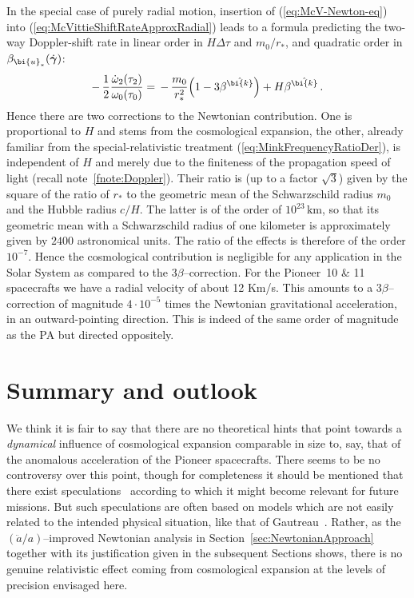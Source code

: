\documentclass
[rmp,aps,twocolumn,showpacs,preprintnumbers,amsmath,amssymb]{revtex4}
\theoremstyle{plain}
\theoremstyle{definition}
\theoremstyle{remark}
\newcommand{\bk}{\bi{k}}
\newcommand{\bu}{\bi{u}}
\newcommand{\bgamma}{\boldsymbol{\gamma}}
\begin{document}
In the special case of purely radial motion, insertion of 
(\ref{eq:McV-Newton-eq}) into (\ref{eq:McVittieShiftRateApproxRadial})
leads to a formula predicting the two-way Doppler-shift rate in 
linear order in $H\Delta\tau$ and $m_0/r_*$, and quadratic order 
in $\beta_{\bu_*}(\dot{\bgamma})$:
%
\begin{equation}\label{eq:McVittie-Doppler-tracking-geodesic}
-\,\frac{1}{2}\frac{\dot\omega_2(\tau_2)}{\omega_0(\tau_0)}
=\,-\,\frac{m_0}{r_*^2} \Big( 1 - 3\beta^{\hat{\bk}} \Big)
          +H\beta^{\hat{\bk}}\,.
\end{equation}
%
Hence there are two corrections to the Newtonian contribution.
One is proportional to $H$ and stems from the cosmological 
expansion, the other, already familiar from the special-relativistic
treatment (\ref{eq:MinkFrequencyRatioDer}), is independent 
of $H$ and merely due to the finiteness of the propagation 
speed of light (recall note~\ref{fnote:Doppler}). Their ratio 
is (up to a factor $\sqrt{3}$) given by the square of the ratio 
of $r_*$ to the geometric mean of the Schwarzschild radius $m_0$ 
and the Hubble radius $c/H$. The latter is of the order of 
$10^{23}\,\mathrm{km}$, so that its geometric mean with a 
Schwarzschild radius of one kilometer is approximately given 
by $2400$ astronomical units. The ratio of the effects is 
therefore of the order $10^{-7}$. Hence the cosmological 
contribution is negligible for any application in the Solar 
System as compared to the $3\beta$--correction. For the Pioneer~10
\& 11 spacecrafts we have a radial velocity of about 12 Km/s. 
This amounts to a $3\beta$--correction of magnitude $4\cdot 10^{-5}$ 
times the Newtonian gravitational acceleration, in an outward-pointing 
direction. This is indeed of the same order of magnitude as the 
PA but directed oppositely. 



\section{Summary and outlook}
\label{sec:Summary}
%
We think it is fair to say that there are no theoretical hints that 
point towards a \emph{dynamical} influence of cosmological expansion 
comparable in size to, say, that of the anomalous acceleration of the 
Pioneer spacecrafts. There seems to be no controversy over this 
point, though for completeness it should be mentioned that there exist 
speculations~\cite{Palle:2005} according to which it might become 
relevant for future missions. But such speculations are often based 
on models which are not easily related to the intended physical 
situation, like that of Gautreau~\cite{Gautreau:1984b}. Rather, as 
the $(\ddot a/a)$--improved Newtonian analysis in 
Section~\ref{sec:NewtonianApproach} together with its justification 
given in the subsequent Sections shows, there is no genuine 
relativistic effect coming from cosmological expansion at the 
levels of precision envisaged here.   
\end{document}
